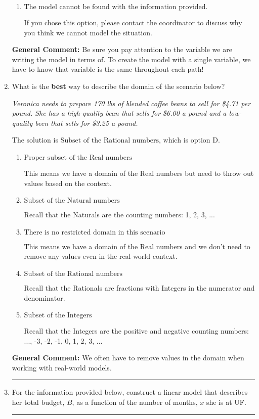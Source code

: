\documentclass{extbook}[14pt]
\newcommand{\litem}[1]{\item #1

\rule{\textwidth}{0.4pt}}
\begin{document}
\begin{enumerate}
{\begin{enumerate}[label=\Alph*.]
Since we know all parts of the path are equal length, we can treat all distance variables as the same variable, $D$.
\item \( \text{The model cannot be found with the information provided.} \)

If you chose this option, please contact the coordinator to discuss why you think we cannot model the situation.
\end{enumerate}

\textbf{General Comment:} Be sure you pay attention to the variable we are writing the model in terms of. To create the model with a single variable, we have to know that variable is the same throughout each path!
}
\litem{
What is the \textbf{best} way to describe the domain of the scenario below?

\begin{center}
    \textit{ Veronica needs to prepare 170 lbs of blended coffee beans to sell for \$4.71 per pound. She has a high-quality bean that sells for \$6.00 a pound and a low-quality been that sells for \$3.25 a pound. }
\end{center}
The solution is \( \text{Subset of the Rational numbers} \), which is option D.\begin{enumerate}[label=\Alph*.]
\item \( \text{Proper subset of the Real numbers} \)

This means we have a domain of the Real numbers but need to throw out values based on the context.
\item \( \text{Subset of the Natural numbers} \)

Recall that the Naturals are the counting numbers: 1, 2, 3, ...
\item \( \text{There is no restricted domain in this scenario} \)

This means we have a domain of the Real numbers and we don't need to remove any values even in the real-world context.
\item \( \text{Subset of the Rational numbers} \)

Recall that the Rationals are fractions with Integers in the numerator and denominator.
\item \( \text{Subset of the Integers} \)

Recall that the Integers are the positive and negative counting numbers: ..., -3, -2, -1, 0, 1, 2, 3, ... 
\end{enumerate}

\textbf{General Comment:} We often have to remove values in the domain when working with real-world models.
}
\litem{
For the information provided below, construct a linear model that describes her total budget, $B$, as a function of the number of months, $x$ she is at UF.

}
\end{enumerate}
\end{document}
